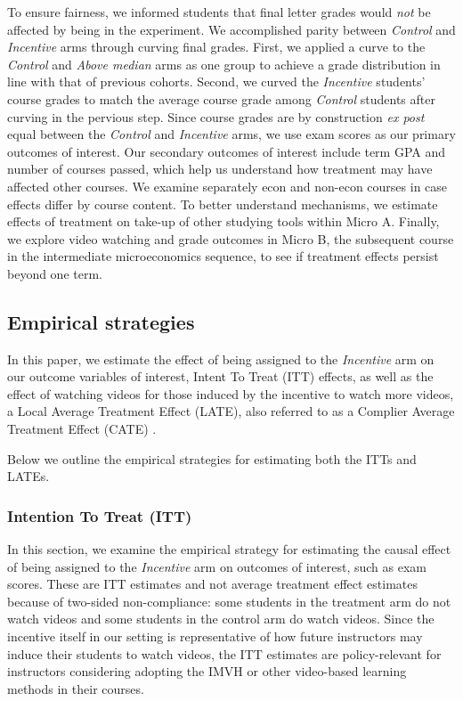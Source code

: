 \documentclass[12pt]{article}
\begin{document}
To ensure fairness, we informed students that final letter grades would \textit{not} be affected by being in the experiment. We accomplished parity between \textit{Control} and \textit{Incentive} arms through curving final grades. First, we applied a curve to the \textit{Control} and \textit{Above median} arms as one group to achieve a grade distribution in line with that of previous cohorts. Second, we curved the \textit{Incentive} students' course grades to match the average course grade among \textit{Control} students after curving in the pervious step. Since course grades are by construction \textit{ex post} equal between the \textit{Control} and \textit{Incentive} arms, we use exam scores as our primary outcomes of interest. Our secondary outcomes of interest include term GPA and number of courses passed, which help us understand how treatment may have affected other courses. We examine separately econ and non-econ courses in case effects differ by course content. To better understand mechanisms, we estimate effects of treatment on take-up of other studying tools within Micro A. Finally, we explore video watching and grade outcomes in Micro B, the subsequent course in the intermediate microeconomics sequence, to see if treatment effects persist beyond one term.



\subsection{Empirical strategies} \label{empiricalstrat}

In this paper, we estimate the effect of being assigned to the \textit{Incentive} arm on our outcome variables of interest, Intent To Treat (ITT) effects, as well as the effect of watching videos for those induced by the incentive to watch more videos, a Local Average Treatment Effect (LATE), also referred to as a Complier Average Treatment Effect (CATE) \parencite{ir2015}.

Below we outline the empirical strategies for estimating both the ITTs and LATEs.

\subsubsection{Intention To Treat (ITT)}

In this section, we examine the empirical strategy for estimating the causal effect of being assigned to the \textit{Incentive} arm on outcomes of interest, such as exam scores. These are ITT estimates and not average treatment effect estimates because of two-sided non-compliance: some students in the treatment arm do not watch videos and some students in the control arm do watch videos. Since the incentive itself in our setting is representative of how future instructors may induce their students to watch videos, the ITT estimates are policy-relevant for instructors considering adopting the IMVH or other video-based learning methods in their courses.
\end{document}

